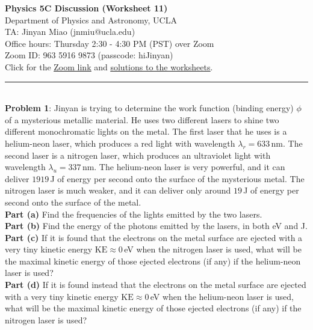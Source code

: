 \documentclass[11pt]{article}
\begin{document}
\Large \noindent \textbf{Physics 5C Discussion (Worksheet 11)}\\
\normalsize
Department of Physics and Astronomy, UCLA\\

\noindent TA: Jinyan Miao (jnmiu@ucla.edu)\\
Office hours: Thursday 2:30 - 4:30 PM (PST) over Zoom \\
Zoom ID: 963 5916 9873 (passcode: hiJinyan)\\
Click for the \href{https://ucla.zoom.us/j/96359169873?pwd=05p7ssCPwTbl8KfxoBNCOuaIbt68jW.1}{\underline{Zoom link}} and \href{https://sites.google.com/umich.edu/jmiu/worksheets}{\underline{solutions to the worksheets}}.\\
\noindent\rule{8cm}{0.4pt}\\

\noindent \textbf{Problem 1}:
Jinyan is trying to determine the work function (binding energy) $\phi$ of a mysterious metallic material. He uses two different lasers to shine two different monochromatic lights on the metal. The first laser that he uses is a helium-neon laser, which produces a red light with wavelength $\lambda_{r}=633\,$nm. The second laser is a nitrogen laser, which produces an ultraviolet light with wavelength $\lambda_u = 337\,$nm. The helium-neon laser is very powerful, and it can deliver $1919\,$J of energy per second onto the surface of the mysterious metal. The nitrogen laser is much weaker, and it can deliver only around $19$\,J of energy per second onto the surface of the metal. \\

\noindent\textbf{Part (a)} Find the frequencies of the lights emitted by the two lasers.\\

\noindent\textbf{Part (b)} Find the energy of the photons emitted by the lasers, in both eV and J. \\

\noindent\textbf{Part (c)} If it is found that the electrons on the metal surface are ejected with a very tiny kinetic energy $\text{KE}\approx 0$\,eV when the nitrogen laser is used, what will be the maximal kinetic energy of those ejected electrons (if any) if the helium-neon laser is used?\\

\noindent\textbf{Part (d)} If it is found instead that the electrons on the metal surface are ejected with a very tiny kinetic energy $\text{KE}\approx 0$\,eV when the helium-neon laser is used, what will be the maximal kinetic energy of those ejected electrons (if any) if the nitrogen laser is used?\\
\end{document}
